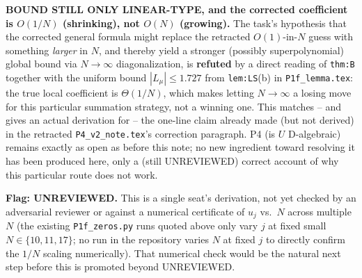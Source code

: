 \documentclass[11pt]{article}
\theoremstyle{remark}
\begin{document}
\textbf{BOUND STILL ONLY LINEAR-TYPE, and the corrected coefficient is $O(1/N)$ (shrinking), not
$O(N)$ (growing).} The task's hypothesis that the corrected general formula might replace the
retracted $O(1)$-in-$N$ guess with something \emph{larger} in $N$, and thereby yield a stronger
(possibly superpolynomial) global bound via $N\to\infty$ diagonalization, is \textbf{refuted} by a
direct reading of \texttt{thm:B} together with the uniform bound $|L_\mu|\le1.727$ from
\texttt{lem:LS}(b) in \texttt{P1f\_lemma.tex}: the true local coefficient is
$\Theta(1/N)$, which makes letting $N\to\infty$ a losing move for this particular summation
strategy, not a winning one. This matches -- and gives an actual derivation for -- the one-line
claim already made (but not derived) in the retracted \texttt{P4\_v2\_note.tex}'s correction
paragraph. P4 (is $U$ D-algebraic) remains exactly as open as before this note; no new ingredient
toward resolving it has been produced here, only a (still UNREVIEWED) correct account of why this
particular route does not work.

\textbf{Flag: UNREVIEWED.} This is a single seat's derivation, not yet checked by an adversarial
reviewer or against a numerical certificate of $u_j$ vs.\ $N$ across multiple $N$ (the existing
\texttt{P1f\_zeros.py} runs quoted above only vary $j$ at fixed small $N\in\{10,11,17\}$; no run in
the repository varies $N$ at fixed $j$ to directly confirm the $1/N$ scaling numerically). That
numerical check would be the natural next step before this is promoted beyond UNREVIEWED.
\end{document}
